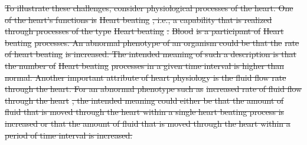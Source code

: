 \documentclass{bioinfo}
\providecommand{\DIFdel}[1]{{\protect\color{red}\sout{#1}}}                      %
\providecommand{\DIFdelbegin}{} %
\providecommand{\DIFdelend}{} %
\begin{document}
\DIFdelbegin \DIFdel{To illustrate these challenges, consider physiological processes of
the heart. One of the heart's functions is }%
\DIFdel{Heart beating}%
\DIFdel{, i.e.,
a capability that is realized through processes of the type }%
\DIFdel{Heart
  beating}%
\DIFdel{. }%
\DIFdel{Blood}%
\DIFdel{is a participant of }%
\DIFdel{Heart beating}%
\DIFdel{processes.  An abnormal phenotype of an organism could be that the
}%
\DIFdel{rate of heart beating}%
\DIFdel{is increased. The intended meaning of such
a description is that the number of }%
\DIFdel{Heart beating}%
\DIFdel{processes in a
given time interval is higher than normal. Another important attribute
of heart physiology is the fluid flow rate through the heart. For an
abnormal phenotype such as }%
\DIFdel{increased rate of fluid flow through
  the heart}%
\DIFdel{, the intended meaning could either be that the amount of
fluid that is moved through the heart within a single heart beating
process is increased or that the amount of fluid that is moved through
the heart within a period of time interval is increased. 
}\DIFdelend %
\end{document}
